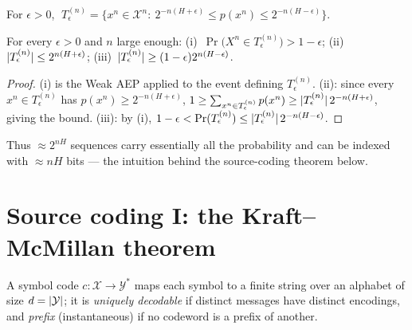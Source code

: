 \documentclass[11pt]{article}
\begin{document}
\begin{definition}
For $\epsilon>0$, $\;T^{(n)}_\epsilon=\big\{x^n\in\mathcal X^n:\ 2^{-n(H+\epsilon)}\le p(x^n)\le
2^{-n(H-\epsilon)}\big\}.$
\end{definition}

\begin{theorem}\label{thm:aep}
For every $\epsilon>0$ and $n$ large enough:
(i)~$\Pr\!\big(X^n\in T^{(n)}_\epsilon\big)>1-\epsilon$;
(ii)~$\lvert T^{(n)}_\epsilon\rvert\le 2^{n(H+\epsilon)}$;
(iii)~$\lvert T^{(n)}_\epsilon\rvert\ge(1-\epsilon)2^{n(H-\epsilon)}$.
\end{theorem}
\begin{proof}
(i) is the Weak AEP applied to the event defining $T^{(n)}_\epsilon$. (ii): since every $x^n\in
T^{(n)}_\epsilon$ has $p(x^n)\ge 2^{-n(H+\epsilon)}$,
$1\ge\sum_{x^n\in T^{(n)}_\epsilon}p(x^n)\ge\lvert T^{(n)}_\epsilon\rvert\,2^{-n(H+\epsilon)}$, giving the
bound. (iii): by (i), $1-\epsilon<\Pr(T^{(n)}_\epsilon)\le\lvert T^{(n)}_\epsilon\rvert\,2^{-n(H-\epsilon)}$.
\end{proof}
Thus $\approx 2^{nH}$ sequences carry essentially all the probability and can be indexed with
$\approx nH$ bits --- the intuition behind the source-coding theorem below.

\section{Source coding I: the Kraft--McMillan theorem}
A symbol code $c:\mathcal X\to\mathcal Y^*$ maps each symbol to a finite string over an alphabet of
size $d=\lvert\mathcal Y\rvert$; it is \emph{uniquely decodable} if distinct messages have distinct
encodings, and \emph{prefix} (instantaneous) if no codeword is a prefix of another.
\end{document}
